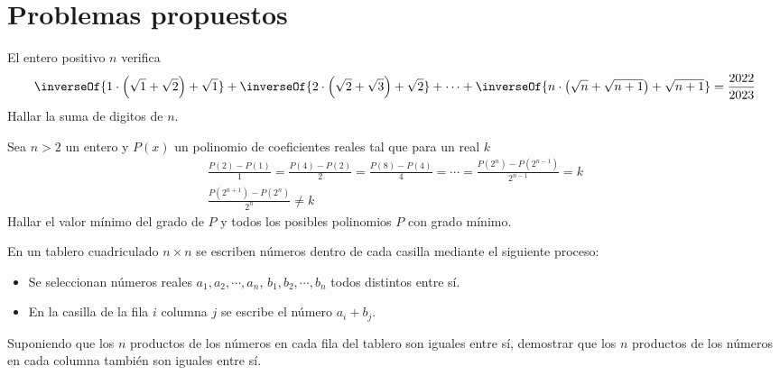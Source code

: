 \section{Problemas propuestos}

\begin{section-problem}
    El entero positivo $n$ verifica
    \[\inverseOf{1\cdot\left(\sqrt {1} + \sqrt {2}\right) + \sqrt {1}} + \inverseOf{2\cdot\left(\sqrt {2} + \sqrt {3}\right) + \sqrt {2}} + \cdots + \inverseOf{n\cdot\left(\sqrt {n} + \sqrt {n + 1}\right) + \sqrt {n + 1}} = \frac{2022}{2023}\]
    Hallar la suma de digitos de $n$.
\end{section-problem}

\begin{section-problem}
    Sea $n > 2$ un entero y $P(x)$ un polinomio de coeficientes reales tal que para un real $k$
    \begin{gather*}
        \frac{P(2) - P(1)}{1} = \frac{P(4) - P(2)}{2} = \frac{P(8) - P(4)}{4} = \cdots = \frac{P(2^n) - P(2^{n - 1})}{2^{n - 1}} = k \\
        \frac{P(2^{n + 1}) - P(2^n)}{2^n} \neq k
    \end{gather*}
    Hallar el valor mínimo del grado de $P$ y todos los posibles polinomios $P$ con grado mínimo.
\end{section-problem}

\begin{section-problem}
    En un tablero cuadriculado $n \times n$ se escriben números dentro de cada casilla mediante el siguiente proceso:
    \begin{itemize}
        \item Se seleccionan números reales $a_1, a_2, \cdots, a_n$, $b_1, b_2, \cdots, b_n$ todos distintos entre sí.
        \item En la casilla de la fila $i$ columna $j$ se escribe el número $a_i + b_j$.
    \end{itemize}
    Suponiendo que los $n$ productos de los números en cada fila del tablero son iguales entre sí, demostrar que los $n$ productos de los números en cada columna también son iguales entre sí.
\end{section-problem}